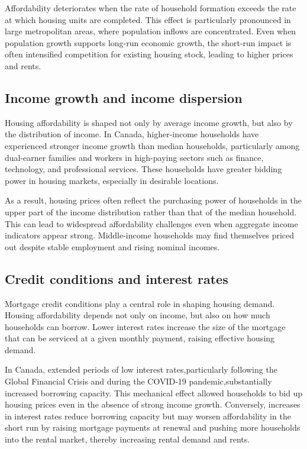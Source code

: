 \documentclass[11pt]{article}
\begin{document}
Affordability deteriorates when the rate of household formation exceeds the rate at which housing units are completed. This effect is particularly pronounced in large metropolitan areas, where population inflows are concentrated. Even when population growth supports long-run economic growth, the short-run impact is often intensified competition for existing housing stock, leading to higher prices and rents.

\subsection*{Income growth and income dispersion}

Housing affordability is shaped not only by average income growth, but also by the distribution of income. In Canada, higher-income households have experienced stronger income growth than median households, particularly among dual-earner families and workers in high-paying sectors such as finance, technology, and professional services. These households have greater bidding power in housing markets, especially in desirable locations.

As a result, housing prices often reflect the purchasing power of households in the upper part of the income distribution rather than that of the median household. This can lead to widespread affordability challenges even when aggregate income indicators appear strong. Middle-income households may find themselves priced out despite stable employment and rising nominal incomes.

\subsection*{Credit conditions and interest rates}

Mortgage credit conditions play a central role in shaping housing demand. Housing affordability depends not only on income, but also on how much households can borrow. Lower interest rates increase the size of the mortgage that can be serviced at a given monthly payment, raising effective housing demand.

In Canada, extended periods of low interest rates,particularly following the Global Financial Crisis and during the COVID-19 pandemic,substantially increased borrowing capacity. This mechanical effect allowed households to bid up housing prices even in the absence of strong income growth. Conversely, increases in interest rates reduce borrowing capacity but may worsen affordability in the short run by raising mortgage payments at renewal and pushing more households into the rental market, thereby increasing rental demand and rents.
\end{document}
